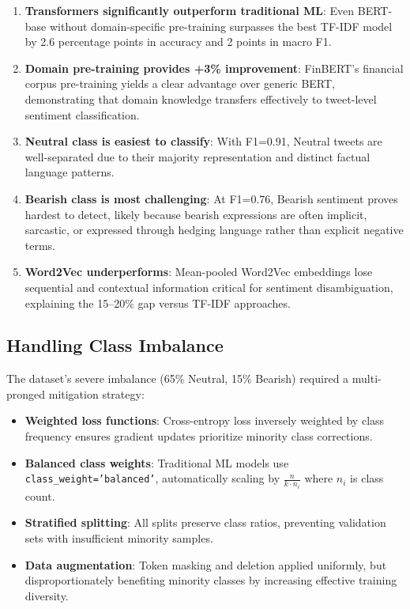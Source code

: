 \documentclass[11pt,a4paper]{article}
\begin{document}
\begin{enumerate}[noitemsep]
    \item \textbf{Transformers significantly outperform traditional ML}: Even BERT-base without domain-specific pre-training surpasses the best TF-IDF model by 2.6 percentage points in accuracy and 2 points in macro F1.

    \item \textbf{Domain pre-training provides +3\% improvement}: FinBERT's financial corpus pre-training yields a clear advantage over generic BERT, demonstrating that domain knowledge transfers effectively to tweet-level sentiment classification.

    \item \textbf{Neutral class is easiest to classify}: With F1=0.91, Neutral tweets are well-separated due to their majority representation and distinct factual language patterns.

    \item \textbf{Bearish class is most challenging}: At F1=0.76, Bearish sentiment proves hardest to detect, likely because bearish expressions are often implicit, sarcastic, or expressed through hedging language rather than explicit negative terms.

    \item \textbf{Word2Vec underperforms}: Mean-pooled Word2Vec embeddings lose sequential and contextual information critical for sentiment disambiguation, explaining the 15--20\% gap versus TF-IDF approaches.
\end{enumerate}

\subsection{Handling Class Imbalance}

The dataset's severe imbalance (65\% Neutral, 15\% Bearish) required a multi-pronged mitigation strategy:

\begin{itemize}[noitemsep]
    \item \textbf{Weighted loss functions}: Cross-entropy loss inversely weighted by class frequency ensures gradient updates prioritize minority class corrections.
    \item \textbf{Balanced class weights}: Traditional ML models use \texttt{class\_weight='balanced'}, automatically scaling by $\frac{n}{k \cdot n_i}$ where $n_i$ is class count.
    \item \textbf{Stratified splitting}: All splits preserve class ratios, preventing validation sets with insufficient minority samples.
    \item \textbf{Data augmentation}: Token masking and deletion applied uniformly, but disproportionately benefiting minority classes by increasing effective training diversity.
\end{itemize}
\end{document}
